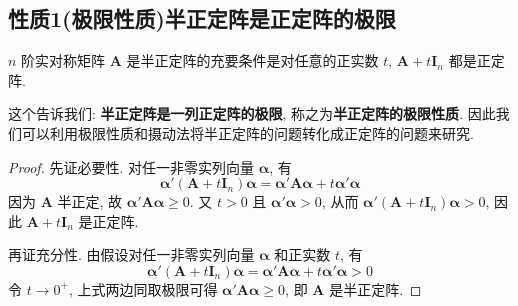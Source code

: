 \documentclass[../../main.tex]{subfiles}
\begin{document}
\subsection{性质1(极限性质)半正定阵是正定阵的极限}

\begin{proposition}\label{proposition:半正定阵关于摄动的充要条件}
\(n\) 阶实对称矩阵 \(\boldsymbol{A}\) 是半正定阵的充要条件是对任意的正实数 \(t\), \(\boldsymbol{A}+t\boldsymbol{I}_n\) 都是正定阵.
\end{proposition}
\begin{remark}
这个告诉我们: \textbf{半正定阵是一列正定阵的极限}, 称之为\textbf{半正定阵的极限性质}. 因此我们可以利用极限性质和摄动法将半正定阵的问题转化成正定阵的问题来研究.
\end{remark}
\begin{proof}
先证必要性. 对任一非零实列向量 \(\boldsymbol{\alpha}\), 有
\[\boldsymbol{\alpha}'(\boldsymbol{A}+t\boldsymbol{I}_n)\boldsymbol{\alpha}=\boldsymbol{\alpha}'\boldsymbol{A}\boldsymbol{\alpha}+t\boldsymbol{\alpha}'\boldsymbol{\alpha}\]
因为 \(\boldsymbol{A}\) 半正定, 故 \(\boldsymbol{\alpha}'\boldsymbol{A}\boldsymbol{\alpha}\geqslant 0\). 又 \(t>0\) 且 \(\boldsymbol{\alpha}'\boldsymbol{\alpha}>0\), 从而 \(\boldsymbol{\alpha}'(\boldsymbol{A}+t\boldsymbol{I}_n)\boldsymbol{\alpha}>0\), 因此 \(\boldsymbol{A}+t\boldsymbol{I}_n\) 是正定阵.

再证充分性. 由假设对任一非零实列向量 \(\boldsymbol{\alpha}\) 和正实数 \(t\), 有
\[\boldsymbol{\alpha}'(\boldsymbol{A}+t\boldsymbol{I}_n)\boldsymbol{\alpha}=\boldsymbol{\alpha}'\boldsymbol{A}\boldsymbol{\alpha}+t\boldsymbol{\alpha}'\boldsymbol{\alpha}>0\]
令 \(t\to0^+\), 上式两边同取极限可得 \(\boldsymbol{\alpha}'\boldsymbol{A}\boldsymbol{\alpha}\geqslant 0\), 即 \(\boldsymbol{A}\) 是半正定阵. 
\end{proof}
\end{document}
